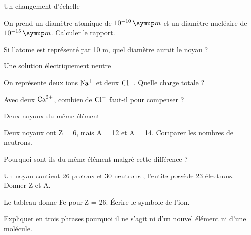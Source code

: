 \par\noindent\begin{minipage}{\linewidth}
\begin{exercice}[3]{Un changement d’échelle}
\begin{questions}
\item On prend un diamètre atomique de $10^{-10}\unite m$ et un diamètre nucléaire de $10^{-15}\unite m$. Calculer le rapport.
\item Si l’atome est représenté par 10 m, quel diamètre aurait le noyau ?
\end{questions}
\end{exercice}
\end{minipage}
\par\noindent\begin{minipage}{\linewidth}
\begin{exercice}[3]{Une solution électriquement neutre}
\begin{questions}
\item On représente deux ions $\ce{Na+}$ et deux $\ce{Cl-}$. Quelle charge totale ?
\item Avec deux $\ce{Ca^{2+}}$, combien de $\ce{Cl-}$ faut-il pour compenser ?
\end{questions}
\end{exercice}
\end{minipage}
\par\noindent\begin{minipage}{\linewidth}
\begin{exercice}[3]{Deux noyaux du même élément}
\begin{questions}
\item Deux noyaux ont Z = 6, mais A = 12 et A = 14. Comparer les nombres de neutrons.
\item Pourquoi sont-ils du même élément malgré cette différence ?
\end{questions}
\end{exercice}
\end{minipage}
\label{defi-ex-2}
\begin{questions}
\item Un noyau contient 26 protons et 30 neutrons ; l’entité possède 23 électrons. Donner Z et A.
\item Le tableau donne Fe pour Z = 26. Écrire le symbole de l’ion.
\item Expliquer en trois phrases pourquoi il ne s’agit ni d’un nouvel élément ni d’une molécule.
\end{questions}
\pcGrille
